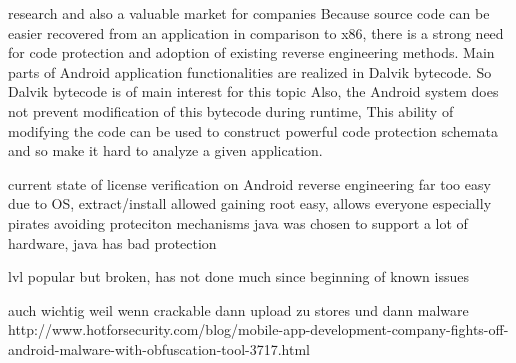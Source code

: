 
research and also a valuable market for companies\newline
Because source code can be easier recovered from an application in comparison
to x86, there is a strong need for code protection and adoption of existing reverse engineering methods. Main parts of Android application functionalities are realized in Dalvik bytecode. So Dalvik bytecode is of main interest for this topic\newline
Also, the Android system does not prevent modification of this bytecode during runtime, This ability of modifying the code can be used to construct
powerful code protection schemata and so make it hard to analyze a given application.\newline
\cite{schulzLabCourse}
%



%
current state of license verification  on Android
reverse engineering far too easy due to OS, extract/install allowed
gaining root easy, allows everyone especially pirates avoiding proteciton mechanisms
java was chosen to support a lot of hardware, java has bad protection

lvl popular but broken, has not done much since beginning of known issues
\cite{munteanLicense}
%

auch wichtig weil wenn crackable dann upload zu stores und dann malware \newline
http://www.hotforsecurity.com/blog/mobile-app-development-company-fights-off-android-malware-with-obfuscation-tool-3717.html\newline
